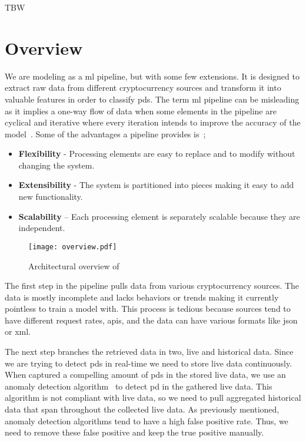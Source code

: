 TBW
\section{Overview}
We are modeling \project as a \ac{ml} pipeline, but with some few extensions. It is designed to extract raw data from different cryptocurrency sources and transform it into valuable features in order to classify \acp{pd}. The term \ac{ml} pipeline can be misleading as it implies a one-way flow of data when some elements in the pipeline are cyclical and iterative where every iteration intends to improve the accuracy of the model~\cite{ml_pipeline_3}. Some of the advantages a pipeline provides is~\cite{ml_pipeline_2};

\begin{itemize}
    \item \textbf{Flexibility} - Processing elements are easy to replace and to modify without changing the system.
    \item \textbf{Extensibility} - The system is partitioned into pieces making it easy to add new functionality.
    \item \textbf{Scalability} – Each processing element is separately scalable because they are independent.
\end{itemize}

\begin{figure}[ht]
    \centering
    \texttt{[image: overview.pdf]}
    \caption{Architectural overview of \project}
    \label{fig:overview}
\end{figure}

The first step in the pipeline pulls data from various cryptocurrency sources. The data is mostly incomplete and lacks behaviors or trends making it currently pointless to train a model with. This process is tedious because sources tend to have different request rates, \acp{api}, and the data can have various formats like \ac{json} or \ac{xml}.

The next step branches the retrieved data in two, live and historical data. Since we are trying to detect \acp{pd} in real-time we need to store live data continuously. When captured a compelling amount of \acp{pd} in the stored live data, we use an anomaly detection algorithm~\cite{P&D_to_the_moon} to detect \ac{pd} in the gathered live data. This algorithm is not compliant with live data, so we need to pull aggregated historical data that span throughout the collected live data. As previously mentioned, anomaly detection algorithms tend to have a high false positive rate. Thus, we need to remove these false positive and keep the true positive manually.

